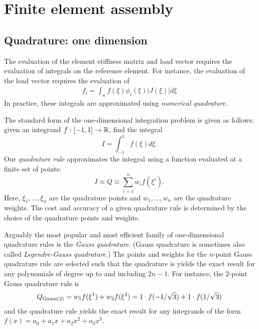 \chapter{Finite element assembly}

\disclaimer

\section{Quadrature: one dimension}
The evaluation of the element stiffness matrix and load vector requires the evaluation of integrals on the reference element.  For instance, the evaluation of the load vector requires the evaluation of
\begin{align*}
  f_i = \int_\kappa f(\xi) \phi_i(\xi) |J(\xi)| d\xi
\end{align*}
In practice, these integrals are approximated using \emph{numerical quadrature}.

The standard form of the one-dimensional integration problem is given as follows: given an integrand $f:[-1,1] \to \mathbb{R}$, find the integral
\begin{equation*}
  I = \int_{-1}^1 f(\xi) d\xi.
\end{equation*}
Our \emph{quadrature rule} approximates the integral using a function evaluated at a finite set of points:
\begin{equation*}
  I \approx Q \equiv \sum_{i=1}^{n} w_i f(\xi^i).
\end{equation*}
Here, $\xi_1, \dots, \xi_n$ are the quadrature points and $w_1, \dots, w_n$ are the quadrature weights.  The cost and accuracy of a given quadrature rule is determined by the choice of the quadrature points and weights.

Arguably the most popular and most efficient family of one-dimensional quadrature rules is the \emph{Gauss quadrature}.  (Gauss quadrature is sometimes also called \emph{Legendre-Gauss quadrature}.)  The points and weights for the $n$-point Gauss quadrature rule are selected such that the quadrature is yields the exact result for any polynomials of degree up to and including $2n-1$.  For instance, the 2-point Gauss quadrature rule is
\begin{equation*}
  Q_{\rm Gauss(2)} = w_1 f(\xi^1) + w_2 f(\xi^2) = 1 \cdot f(-1/\sqrt{3})  + 1 \cdot f(1 / \sqrt{3})
\end{equation*}
and the quadrature rule yields the exact result for any integrands of the form $f(x) = a_0 + a_1 x + a_2 x^2 + a_3 x^3$.

